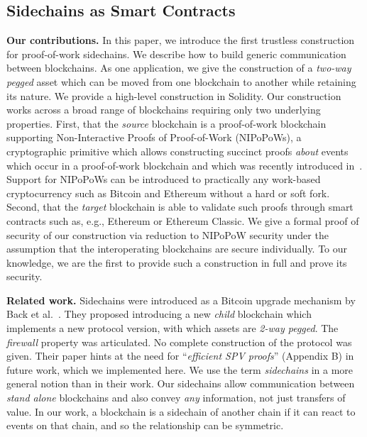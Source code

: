 \subsection{Sidechains as Smart Contracts}



\noindent\textbf{Our contributions. } In this paper, we introduce the first
trustless construction for proof-of-work sidechains. We describe how to build
generic communication between blockchains. As one application, we give the
construction of a \emph{two-way pegged} asset which can be moved from one
blockchain to another while retaining its nature. We provide a high-level
construction in Solidity. Our construction works across a broad range of
blockchains requiring only two underlying properties. First, that the
\emph{source} blockchain is a proof-of-work blockchain supporting
Non-Interactive Proofs of Proof-of-Work (NIPoPoWs), a cryptographic primitive
which allows constructing succinct proofs \emph{about} events which occur in a
proof-of-work blockchain and which was recently introduced in~\cite{nipopows}.
Support for NIPoPoWs can be introduced to practically any
work-based cryptocurrency such as Bitcoin and Ethereum without a hard or soft
fork. Second, that the \emph{target} blockchain is able to validate such proofs
through smart contracts such as, e.g., Ethereum or Ethereum
Classic.
We give a formal proof of security of our construction via
reduction to NIPoPoW security under the assumption that the interoperating
blockchains are secure individually.
To our knowledge, we are the first to
provide such a construction in
full and prove its security.


\noindent\textbf{Related work. }
Sidechains were introduced as a Bitcoin upgrade mechanism by Back et
al.~\cite{sidechains}. They proposed introducing a new \emph{child} blockchain
which implements a new protocol version, with which assets are \emph{2-way
pegged}. The \emph{firewall} property was articulated. No complete construction
of the protocol was given. Their paper hints at the need for ``\emph{efficient
SPV proofs}'' (Appendix B) in future work, which we implemented here. We use the
term \emph{sidechains} in a more general notion than in their work. Our
sidechains allow communication between \emph{stand alone} blockchains and also
convey \emph{any} information, not just transfers of value. In our work, a
blockchain is a sidechain of another chain if it can react to events on that
chain, and so the relationship can be symmetric.

